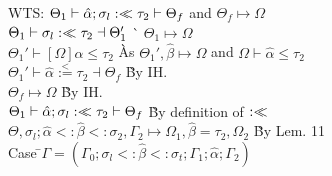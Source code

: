 \documentclass {article}
\newcommand{\alphahat}{\hat{\alpha}}
\newcommand{\betahat}{\hat{\beta}}
\newcommand{\instl}{\overset{<}{:=}}
\newcommand{\sigbndl}{:<\hspace{-5px}<}
\newcommand{\tst}{{\scriptstyle{<:}}}
\newcommand{\bound}[3]{#1 \tst #2 \tst #3}
\newcommand{\ctxmapto}{\longmapsto}
\begin{document}
\begin{tabbing}
\>\>\> WTS: $\Theta_1 \vdash \alphahat;\sigma_l \sigbndl \tau_2 \vdash \Theta_f$ and $\Theta_f \ctxmapto \Omega$\\
\>\>\> $\Theta_1 \vdash \sigma_l \sigbndl \tau_2 \dashv \Theta_1'$ 	\` $\Theta_1 \ctxmapto \Omega$\\
\>\>\> $\Theta_1' \vdash [\Omega]\alphahat \leq \tau_2$ 			\` As $\Theta_1',\betahat \ctxmapto \Omega$ and  $\Omega \vdash \alphahat \leq \tau_2$\\
\>\>\> $\Theta_1' \vdash \alphahat \instl \tau_2 \dashv \Theta_{f}$ 			\` By IH.\\
\>\>\> $\Theta_f \ctxmapto \Omega$												\` By IH.\\
\>\>\> $\Theta_1 \vdash \alphahat;\sigma_l \sigbndl \tau_2 \vdash \Theta_f$		\` By definition of $\sigbndl$\\
\>\>\> $\Theta,\bound{\sigma_l;\alphahat}{\betahat}{\sigma_2},\Gamma_2 \ctxmapto \Omega_1,\betahat=\tau_2,\Omega_2$ \` By Lem. 11\\
\>\>Case \=$\Gamma = (\Gamma_0;\bound{\sigma_l}{\betahat}{\sigma_t};\Gamma_1;\alphahat;\Gamma_2)$\\
\end{tabbing}
\end{document}
